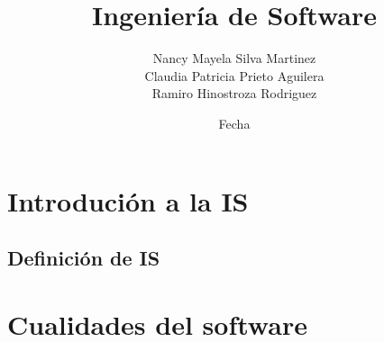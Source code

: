 \documentclass{book}
\title{Ingenier\'ia de Software}
\author{ Nancy Mayela Silva Martinez \\ Claudia Patricia Prieto Aguilera \\ Ramiro Hinostroza Rodriguez\\  }
\date{Fecha}
\begin{document}
\maketitle

\chapter{Introduci\'on a la IS}

\section{ Definici\'on de IS}

%


\chapter{Cualidades del software}


%

\end{document}
